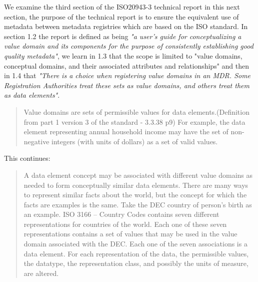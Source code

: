 \documentclass{article}
\begin{document}
We examine the third section of the  ISO20943-3 technical report in this next section, the purpose of the technical report is to ensure the equivalent use of metadata between metadata registries which are based on the ISO standard. In section 1.2 the report is defined as being \emph{"a user’s guide for conceptualizing a value domain and its components for the purpose of consistently establishing good quality metadata"}, we learn in 1.3 that the scope is limited to "value domains, conceptual domains, and their associated attributes and relationships" and then in 1.4 that \emph{"There is a choice when registering value domains in an MDR. Some Registration Authorities treat these sets	as value domains, and others treat them as data elements"}.
\begin{quote}
	Value domains are sets of permissible values for data elements.(Definition from part 1 version 3 of the standard - 3.3.38 p9) For example, the data element representing annual household income may have the set of non-negative integers (with units of dollars) as a set of valid values.
\end{quote}
This continues:
\begin{quote}
	A data element concept may be associated with different value domains as needed to form conceptually
	similar data elements. There are many ways to represent similar facts about the world, but the concept for
	which the facts are examples is the same. Take the DEC country of person's birth as an example. ISO 3166
	– Country Codes contains seven different representations for countries of the world. Each one of these seven
	representations contains a set of values that may be used in the value domain associated with the DEC.
	Each one of the seven associations is a data element. For each representation of the data, the permissible
	values, the datatype, the representation class, and possibly the units of measure, are altered.
\end{quote}
\end{document}
